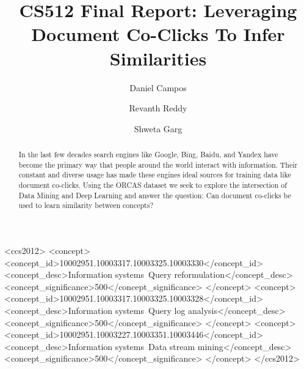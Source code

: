 \documentclass[sigplan,screen]{acmart}
\begin{document}
\title{CS512 Final Report: Leveraging Document Co-Clicks To Infer Similarities}


\author{Daniel Campos} \author{Revanth Reddy}
\author{Shweta Garg} 


\begin{abstract}
In the last few decades search engines like Google, Bing, Baidu, and Yandex have become the primary way that people around the world interact with information. Their constant and diverse usage has made these engines ideal sources for training data like document co-clicks. Using the ORCAS dataset we seek to explore the intersection of Data Mining and Deep Learning and answer the question: Can document co-clicks be used to learn similarity between concepts?
\end{abstract}

\begin{CCSXML}
<ccs2012>
<concept>
<concept_id>10002951.10003317.10003325.10003330</concept_id>
<concept_desc>Information systems~Query reformulation</concept_desc>
<concept_significance>500</concept_significance>
</concept>
<concept>
<concept_id>10002951.10003317.10003325.10003328</concept_id>
<concept_desc>Information systems~Query log analysis</concept_desc>
<concept_significance>500</concept_significance>
</concept>
<concept>
<concept_id>10002951.10003227.10003351.10003446</concept_id>
<concept_desc>Information systems~Data stream mining</concept_desc>
<concept_significance>500</concept_significance>
</concept>
</ccs2012>
\end{CCSXML}



\maketitle







\end{document}
